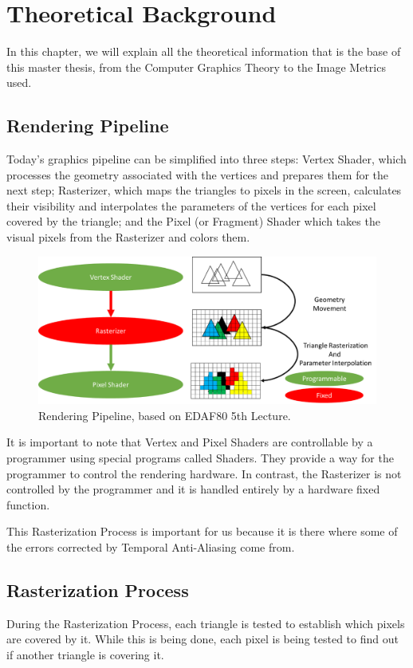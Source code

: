 \documentclass{cslthse-msc}
\begin{document}
\chapter{Theoretical Background}
In this chapter, we will explain all the theoretical information that is the base of this master thesis, from the Computer Graphics Theory to the Image Metrics used.

\section{Rendering Pipeline}
Today’s graphics pipeline can be simplified into three steps: Vertex Shader, which processes the geometry associated with the vertices and prepares them for the next step; Rasterizer, which maps the triangles to pixels in the screen, calculates their visibility and interpolates the parameters of the vertices for each pixel covered by the triangle; and the Pixel (or Fragment) Shader which takes the visual pixels from the Rasterizer and colors them.

\begin{figure}[!hbt]
	\centering
	\includegraphics[scale=0.7]{images/graphics_pipeline.png} 
	\caption{Rendering Pipeline, based on EDAF80 5th Lecture.~\cite{Doggett2017EDAF80}}\label{fig:graphpipeline}
\end{figure}

It is important to note that Vertex and Pixel Shaders are controllable by a programmer using special programs called Shaders. They provide a way for the programmer to control the rendering hardware. In contrast, the Rasterizer is not controlled by the programmer and it is handled entirely by a hardware fixed function. \cite{Doggett2017EDAF80}

This Rasterization Process is important for us because it is there where some of the errors corrected by Temporal Anti-Aliasing come from.

\section{Rasterization Process}
During the Rasterization Process, each triangle is tested to establish which pixels are covered by it. While this is being done, each pixel is being tested to find out if another triangle is covering it.
\end{document}
